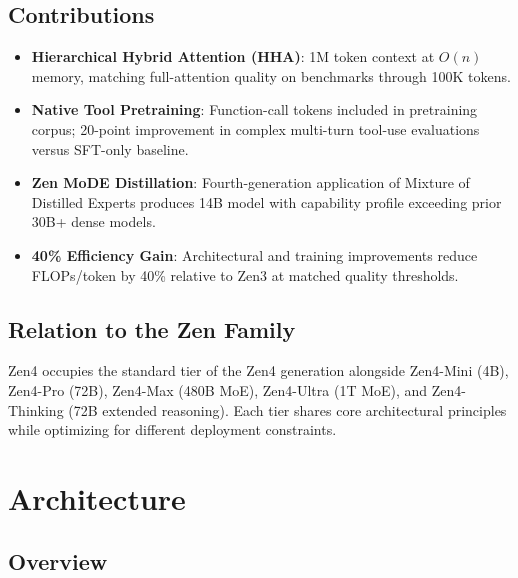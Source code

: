 \documentclass[11pt,a4paper]{article}
\begin{document}
\subsection{Contributions}

\begin{itemize}
    \item \textbf{Hierarchical Hybrid Attention (HHA)}: 1M token context at $O(n)$ memory,
    matching full-attention quality on benchmarks through 100K tokens.
    \item \textbf{Native Tool Pretraining}: Function-call tokens included in pretraining corpus;
    20-point improvement in complex multi-turn tool-use evaluations versus SFT-only baseline.
    \item \textbf{Zen MoDE Distillation}: Fourth-generation application of Mixture of Distilled
    Experts produces 14B model with capability profile exceeding prior 30B+ dense models.
    \item \textbf{40\% Efficiency Gain}: Architectural and training improvements reduce FLOPs/token
    by 40\% relative to Zen3 at matched quality thresholds.
\end{itemize}

\subsection{Relation to the Zen Family}

Zen4 occupies the standard tier of the Zen4 generation alongside Zen4-Mini (4B), Zen4-Pro (72B),
Zen4-Max (480B MoE), Zen4-Ultra (1T MoE), and Zen4-Thinking (72B extended reasoning). Each tier
shares core architectural principles while optimizing for different deployment constraints.

\section{Architecture}

\subsection{Overview}
\end{document}
